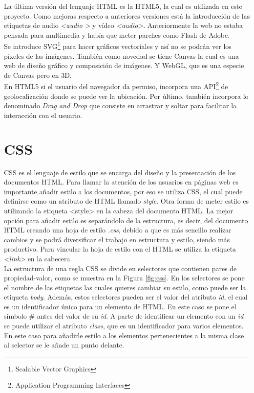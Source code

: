La última versión del lenguaje HTML es la HTML5, la cual es utilizada en este proyecto. Como mejoras respecto a anteriores versiones está la introducción de las etiquetas de audio \textit{\textless audio \textgreater} y vídeo \textit{\textless audio\textgreater}. Anteriormente la web no estaba pensada para multimedia y había que meter parches como Flash de Adobe.\\

Se introduce SVG\footnote{Scalable Vector Graphics } para hacer gráficos vectoriales y así no se podrán ver los píxeles de las imágenes. También como novedad se tiene Canvas la cual es una web de diseño gráfico y composición de imágenes. Y WebGL, que es una especie de Canvas pero en 3D. \\

En HTML5 si el usuario del navegador da permiso, incorpora una API\footnote{Application Programming Interfaces} de geolocalización donde se puede ver la ubicación. Por último, también incorpora lo denominado \textit{Drag and Drop} que consiste en arrastrar y soltar para facilitar la interacción con el usuario.\\


\newpage
\section{CSS}
CSS es el lenguaje de estilo que se encarga del diseño y la presentación de los documentos HTML. Para llamar la atención de los usuarios en páginas web es importante añadir estilo a los documentos, por eso se utiliza CSS, el cual puede definirse como un atributo de HTML llamado \textit{style}. Otra forma de meter estilo es utilizando la etiqueta {\textless style\textgreater} en la cabeza del documento HTML. La mejor opción para añadir estilo es separándolo de la estructura, es decir, del documento HTML creando una hoja de estilo \textit{.css},  debido a que es más sencillo realizar cambios y se podrá diversificar el trabajo en estructura y estilo, siendo más productivo. Para vincular la hoja de estilo con el HTML se utiliza la etiqueta \textit{\textless link\textgreater} en la cabecera.\\

La estructura de una regla CSS se divide en selectores que contienen pares de propiedad-valor, como se muestra en la Figura \ref{fig:css}. En los selectores se pone el nombre de las etiquetas las cuales quieres cambiar su estilo, como puede ser la etiqueta \textit{body}. Además, estos selectores pueden ser el valor del atributo \textit{id}, el cual es un identificador único para un elemento de HTML. En este caso se pone el símbolo \# antes del valor de su \textit{id}. A parte de identificar un elemento con un \textit{id} se puede utilizar el atributo \textit{class}, que es un identificador para varios elementos. En este caso para añadirle estilo a los elementos pertenecientes a la misma clase al selector se le añade un punto delante.

